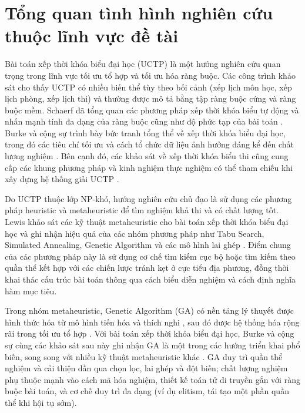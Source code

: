 \documentclass[a4paper,12pt,oneside]{article}
\begin{document}
	\section*{Tổng quan tình hình nghiên cứu thuộc lĩnh vực đề tài}
	
	Bài toán xếp thời khóa biểu đại học (UCTP) là một hướng nghiên cứu quan trọng trong lĩnh vực tối ưu tổ hợp và tối ưu hóa ràng buộc. Các công trình khảo sát cho thấy UCTP có nhiều biến thể tùy theo bối cảnh (xếp lịch môn học, xếp lịch phòng, xếp lịch thi) và thường được mô tả bằng tập ràng buộc cứng và ràng buộc mềm. Schaerf đã tổng quan các phương pháp xếp thời khóa biểu tự động và nhấn mạnh tính đa dạng của ràng buộc cũng như độ phức tạp của bài toán \cite{schaerf1999survey}. Burke và cộng sự trình bày bức tranh tổng thể về xếp thời khóa biểu đại học, trong đó các tiêu chí tối ưu và cách tổ chức dữ liệu ảnh hưởng đáng kể đến chất lượng nghiệm \cite{burke1997automated}. Bên cạnh đó, các khảo sát về xếp thời khóa biểu thi cũng cung cấp các khung phương pháp và kinh nghiệm thực nghiệm có thể tham chiếu khi xây dựng hệ thống giải UCTP \cite{qu2009survey}.
	
	Do UCTP thuộc lớp NP-khó, hướng nghiên cứu chủ đạo là sử dụng các phương pháp heuristic và metaheuristic để tìm nghiệm khả thi và có chất lượng tốt. Lewis khảo sát các kỹ thuật metaheuristic cho bài toán xếp thời khóa biểu đại học và ghi nhận hiệu quả của các nhóm phương pháp như Tabu Search, Simulated Annealing, Genetic Algorithm và các mô hình lai ghép \cite{lewis2008survey}. Điểm chung của các phương pháp này là sử dụng cơ chế tìm kiếm cục bộ hoặc tìm kiếm theo quần thể kết hợp với các chiến lược tránh kẹt ở cực tiểu địa phương, đồng thời khai thác cấu trúc bài toán thông qua cách biểu diễn nghiệm và cách định nghĩa hàm mục tiêu.
	
	Trong nhóm metaheuristic, Genetic Algorithm (GA) có nền tảng lý thuyết được hình thức hóa từ mô hình tiến hóa và thích nghi \cite{holland1975adaptation}, sau đó được hệ thống hóa rộng rãi trong tối ưu tổ hợp \cite{goldberg1989genetic,eiben2015introduction}. Với bài toán xếp thời khóa biểu đại học, Burke và cộng sự cùng các khảo sát sau này ghi nhận GA là một trong các hướng triển khai phổ biến, song song với nhiều kỹ thuật metaheuristic khác \cite{burke1997automated,lewis2008survey}. GA duy trì quần thể nghiệm và cải thiện dần qua chọn lọc, lai ghép và đột biến; chất lượng nghiệm phụ thuộc mạnh vào cách mã hóa nghiệm, thiết kế toán tử di truyền gắn với ràng buộc bài toán, và cơ chế duy trì đa dạng (ví dụ elitism, tái tạo một phần quần thể khi hội tụ sớm).
	
\end{document}
